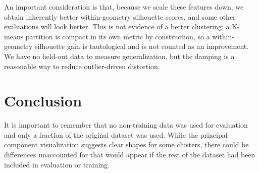 An important consideration is that, because we scale these features down, we
obtain inherently better within-geometry silhouette scores, and some other
evaluations will look better. This is not evidence of a better clustering: a
K-means partition is compact in its own metric by construction, so a
within-geometry silhouette gain is tautological and is not counted as an
improvement. We have no held-out data to measure generalization, but the damping
is a reasonable way to reduce outlier-driven distortion.

\section{Conclusion}
It is important to remember that no non-training data was used for evaluation and
only a fraction of the original dataset was used. While the principal-component
visualization suggests clear shapes for some clusters, there could be
differences unaccounted for that would appear if the rest of the dataset had been
included in evaluation or training.

